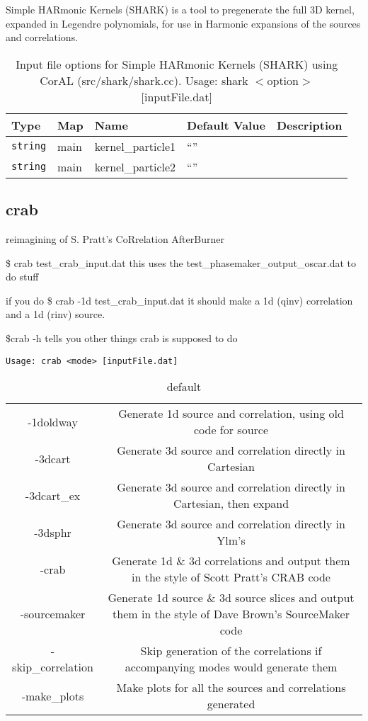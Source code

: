 \documentclass[10pt]{article}
\begin{document}
Simple HARmonic Kernels (SHARK)  is a tool to pregenerate the full 3D kernel, expanded in Legendre polynomials, 
for use in Harmonic expansions of the sources and correlations.
        \begin{table}
            \begin{tabular}{lllll}
                \hline\hline
                Type & Map & Name & Default Value & Description \\
                \hline\hline 
                {\tt string} & main & kernel\_particle1 & ``'' & \\\hline
                {\tt string} & main & kernel\_particle2 & ``'' & \\\hline
            \end{tabular}
            \caption{Input file options for Simple HARmonic Kernels (SHARK) using CorAL (src/shark/shark.cc). Usage: shark $<$option$>$ [inputFile.dat]}
            \label{sharkCLOptions}
        \end{table}


\subsection{crab}
reimagining of S. Pratt's CoRrelation AfterBurner

\$ crab test\_crab\_input.dat
this uses the test\_phasemaker\_output\_oscar.dat to do stuff

if you do
\$ crab -1d test\_crab\_input.dat
it should make a 1d (qinv) correlation and a 1d (rinv) source.

\$crab -h
tells you other things crab is supposed to do


{\tt Usage: crab <mode> [inputFile.dat]}
\begin{table}
\caption{default}
\begin{center}
\begin{tabular}{|c|c|}
	-1doldway		& Generate 1d source and correlation, using old code for source\\
	-3dcart       	& Generate 3d source and correlation directly in Cartesian\\
	-3dcart\_ex    	& Generate 3d source and correlation directly in Cartesian, then expand\\
	-3dsphr       	& Generate 3d source and correlation directly in Ylm's\\
	-crab        	 	&  Generate 1d \& 3d correlations and output them in the style of Scott Pratt's CRAB code\\
	-sourcemaker  	& Generate 1d source \& 3d source slices and output them in the style of Dave Brown's SourceMaker code\\
	-skip\_correlation  & Skip generation of the correlations if accompanying modes would generate them\\
	-make\_plots   & Make plots for all the sources and correlations generated\\
\end{tabular}
\end{center}
\label{crabCLOptions}
\end{table}
\end{document}
